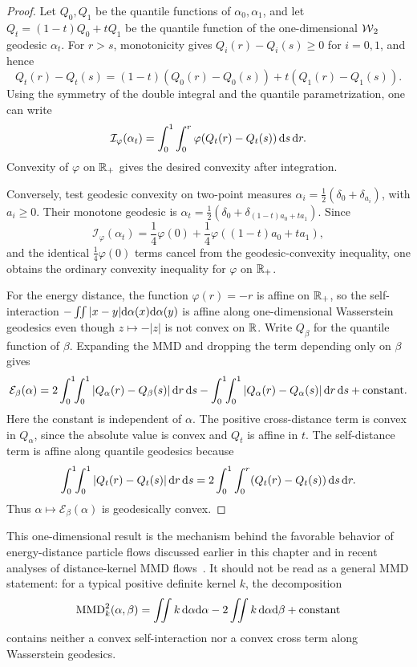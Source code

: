 \begin{proof}
	Let \(Q_0,Q_1\) be the quantile functions of \(\alpha_0,\alpha_1\), and let \(Q_t=(1-t)Q_0+tQ_1\) be the quantile function of the one-dimensional \(\operatorname{\mathcal{W}}_2\) geodesic \(\alpha_t\). For \(r>s\), monotonicity gives \(Q_i(r)-Q_i(s)\geq0\) for \(i=0,1\), and hence
	\[
		Q_t(r)-Q_t(s)
		=
		(1-t)(Q_0(r)-Q_0(s))+t(Q_1(r)-Q_1(s)).
	\]
	Using the symmetry of the double integral and the quantile parametrization, one can write
	\[
		\mathcal I_\varphi(\alpha_t)
		=
		\int_0^1\int_0^r
		\varphi(Q_t(r)-Q_t(s))\,\mathrm{d} s\,\mathrm{d} r.
	\]
	Convexity of \(\varphi\) on \(\mathbb{R}_+\) gives the desired convexity after integration.

	Conversely, test geodesic convexity on two-point measures \(\alpha_i=\frac12(\delta_0+\delta_{a_i})\), with \(a_i\geq0\). Their monotone geodesic is \(\alpha_t=\frac12(\delta_0+\delta_{(1-t)a_0+t a_1})\). Since
	\[
		\mathcal I_\varphi(\alpha_t)
		=
		\frac14\varphi(0)+\frac14\varphi((1-t)a_0+t a_1),
	\]
	and the identical \(\frac14\varphi(0)\) terms cancel from the geodesic-convexity inequality, one obtains the ordinary convexity inequality for \(\varphi\) on \(\mathbb{R}_+\).

	For the energy distance, the function \(\varphi(r)=-r\) is affine on \(\mathbb{R}_+\), so the self-interaction \(-\iint |x-y|\mathrm{d}\alpha(x)\mathrm{d}\alpha(y)\) is affine along one-dimensional Wasserstein geodesics even though \(z\mapsto-|z|\) is not convex on \(\mathbb{R}\). Write \(Q_\beta\) for the quantile function of \(\beta\). Expanding the MMD and dropping the term depending only on \(\beta\) gives
	\[
		\mathcal E_\beta(\alpha)
		=
		2\int_0^1\!\!\int_0^1 |Q_\alpha(r)-Q_\beta(s)|\,\mathrm{d} r\,\mathrm{d} s
		-
		\int_0^1\!\!\int_0^1 |Q_\alpha(r)-Q_\alpha(s)|\,\mathrm{d} r\,\mathrm{d} s
		+\mathrm{constant}.
	\]
	Here the constant is independent of \(\alpha\). The positive cross-distance term is convex in \(Q_\alpha\), since the absolute value is convex and \(Q_t\) is affine in \(t\). The self-distance term is affine along quantile geodesics because
	\[
		\int_0^1\!\!\int_0^1 |Q_t(r)-Q_t(s)|\,\mathrm{d} r\,\mathrm{d} s
		=
		2\int_0^1\int_0^r (Q_t(r)-Q_t(s))\,\mathrm{d} s\,\mathrm{d} r.
	\]
	Thus \(\alpha\mapsto\mathcal E_\beta(\alpha)\) is geodesically convex.
\end{proof}

This one-dimensional result is the mechanism behind the favorable behavior of energy-distance particle flows discussed earlier in this chapter and in recent analyses of distance-kernel MMD flows~\cite{DuongRuxSteinSteidl2024DistanceMMD}. It should not be read as a general MMD statement: for a typical positive definite kernel \(k\), the decomposition
\[
	\operatorname{MMD}_k^2(\alpha,\beta)
	=
	\iint k\,\mathrm{d}\alpha\mathrm{d}\alpha
	-2\iint k\,\mathrm{d}\alpha\mathrm{d}\beta
	+\mathrm{constant}
\]
contains neither a convex self-interaction nor a convex cross term along Wasserstein geodesics.

